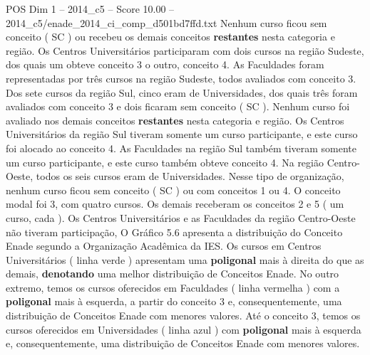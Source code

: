 \begin{textsample}{POS Dim 1 – 2014\_c5 – Score 10.00 – 2014\_c5/enade\_2014\_ci\_comp\_d501bd7ffd.txt}
Nenhum curso ficou sem conceito ( SC ) ou recebeu os demais conceitos \textbf{restantes} nesta categoria e região.
Os Centros Universitários participaram com dois cursos na região Sudeste, dos quais um obteve conceito 3 o outro, conceito 4.
As Faculdades foram representadas por três cursos na região Sudeste, todos avaliados com conceito 3.
Dos sete cursos da região Sul, cinco eram de Universidades, dos quais três foram avaliados com conceito 3 e dois ficaram sem conceito ( SC ).
Nenhum curso foi avaliado nos demais conceitos \textbf{restantes} nesta categoria e região.
Os Centros Universitários da região Sul tiveram somente um curso participante, e este curso foi alocado ao conceito 4.
As Faculdades na região Sul também tiveram somente um curso participante, e este curso também obteve conceito 4.
Na região Centro-Oeste, todos os seis cursos eram de Universidades.
Nesse tipo de organização, nenhum curso ficou sem conceito ( SC ) ou com conceitos 1 ou 4.
O conceito modal foi 3, com quatro cursos.
Os demais receberam os conceitos 2 e 5 ( um curso, cada ).
Os Centros Universitários e as Faculdades da região Centro-Oeste não tiveram participação, O Gráfico 5.6 apresenta a distribuição do Conceito Enade segundo a Organização Acadêmica da IES.
Os cursos em Centros Universitários ( linha verde ) apresentam uma \textbf{poligonal} mais à direita do que as demais, \textbf{denotando} uma melhor distribuição de Conceitos Enade.
No outro extremo, temos os cursos oferecidos em Faculdades ( linha vermelha ) com a \textbf{poligonal} mais à esquerda, a partir do conceito 3 e, consequentemente, uma distribuição de Conceitos Enade com menores valores.
Até o conceito 3, temos os cursos oferecidos em Universidades ( linha azul ) com \textbf{poligonal} mais à esquerda e, consequentemente, uma distribuição de Conceitos Enade com menores valores.

\end{textsample}
